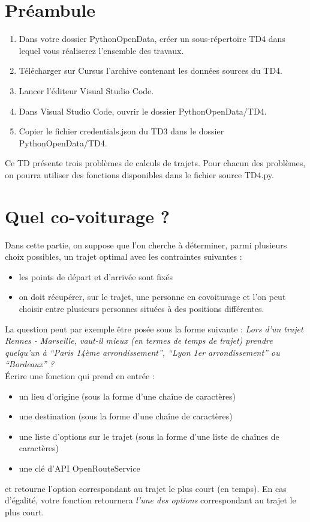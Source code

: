 \documentclass[11pt,a4paper]{article}
\begin{document}
\section*{Préambule}
\begin{enumerate}
    \item Dans votre dossier PythonOpenData, créer un sous-répertoire TD4 dans lequel vous réaliserez l'ensemble des travaux. 
    \item Télécharger sur Cursus l'archive contenant les données sources du TD4.
    \item Lancer l'éditeur Visual Studio Code.
    \item Dans Visual Studio Code, ouvrir le dossier PythonOpenData/TD4. 
    \item Copier le fichier credentials.json du TD3 dans le dossier PythonOpenData/TD4.
\end{enumerate}

Ce TD présente trois problèmes de calculs de trajets. Pour chacun des problèmes, on pourra utiliser des fonctions disponibles dans le fichier source TD4.py.

\section{Quel co-voiturage ?}

Dans cette partie, on suppose que l’on cherche à déterminer, parmi plusieurs choix possibles, un trajet optimal avec les contraintes suivantes :
\begin{itemize}
    \item les points de départ et d’arrivée sont fixés
    \item on doit récupérer, sur le trajet, une personne en covoiturage et l’on peut choisir entre plusieurs personnes situées à des positions différentes.
\end{itemize}

La question peut par exemple être posée sous la forme suivante : \emph{
    Lors d’un trajet Rennes - Marseille, vaut-il mieux (en termes de temps de trajet) prendre quelqu’un à “Paris 14ème arrondissement”, “Lyon 1er arrondissement” ou “Bordeaux” ? }
\\

    Écrire une fonction qui prend en entrée :
    \begin{itemize}
        \item un lieu d’origine (sous la forme d’une chaîne de caractères)
        \item une destination (sous la forme d’une chaîne de caractères)
        \item une liste d’options sur le trajet (sous la forme d’une liste de chaînes de caractères)
        \item une clé d'API OpenRouteService
    \end{itemize}
    et retourne l’option correspondant au trajet le plus court (en temps). En cas d’égalité, votre fonction retournera \emph{l’une des options} correspondant au trajet le plus court.
\end{document}
